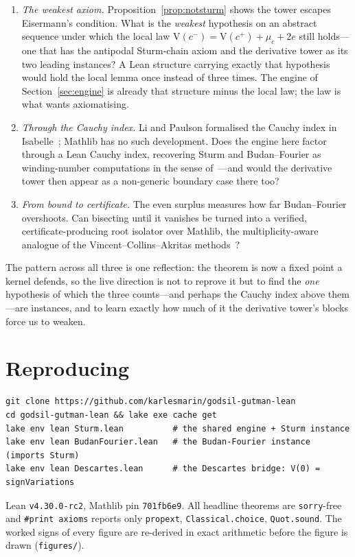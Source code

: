 \documentclass[11pt]{article}
\newcommand{\lean}[1]{\texttt{#1}}
\newcommand{\V}{\mathrm{V}}
\begin{document}
\begin{enumerate}\itemsep3pt
\item \emph{The weakest axiom.} Proposition~\ref{prop:notsturm} shows the tower escapes Eisermann's
condition. What is the \emph{weakest} hypothesis on an abstract sequence under which the local law
$\V(c^-)=\V(c^+)+\mu_c+2e$ still holds---one that has the antipodal Sturm-chain axiom and the derivative
tower as its two leading instances? A Lean structure carrying exactly that hypothesis would hold the
local lemma once instead of three times. The engine of Section~\ref{sec:engine} is already that
structure minus the local law; the law is what wants axiomatising.
\item \emph{Through the Cauchy index.} Li and Paulson formalised the Cauchy index in
Isabelle~\cite{liCauchy}; Mathlib has no such development. Does the engine here factor through a Lean
Cauchy index, recovering Sturm and Budan--Fourier as winding-number computations in the sense
of~\cite{eisermann}---and would the derivative tower then appear as a non-generic boundary case there too?
\item \emph{From bound to certificate.} The even surplus measures how far Budan--Fourier overshoots.
Can bisecting until it vanishes be turned into a verified, certificate-producing root isolator over
Mathlib, the multiplicity-aware analogue of the Vincent--Collins--Akritas methods~\cite{collinsakritas}?
\end{enumerate}

\noindent The pattern across all three is one reflection: the theorem is now a fixed point a kernel
defends, so the live direction is not to reprove it but to find the \emph{one} hypothesis of which the
three counts---and perhaps the Cauchy index above them---are instances, and to learn exactly how much of
it the derivative tower's blocks force us to weaken.

\section*{Reproducing}
\begin{verbatim}
git clone https://github.com/karlesmarin/godsil-gutman-lean
cd godsil-gutman-lean && lake exe cache get
lake env lean Sturm.lean          # the shared engine + Sturm instance
lake env lean BudanFourier.lean   # the Budan-Fourier instance (imports Sturm)
lake env lean Descartes.lean      # the Descartes bridge: V(0) = signVariations
\end{verbatim}
Lean \lean{v4.30.0-rc2}, Mathlib pin \lean{701fb6e9}. All headline theorems are \lean{sorry}-free and
\lean{\#print axioms} reports only \lean{propext}, \lean{Classical.choice}, \lean{Quot.sound}. The
worked signs of every figure are re-derived in exact arithmetic before the figure is drawn
(\lean{figures/}).
\end{document}

